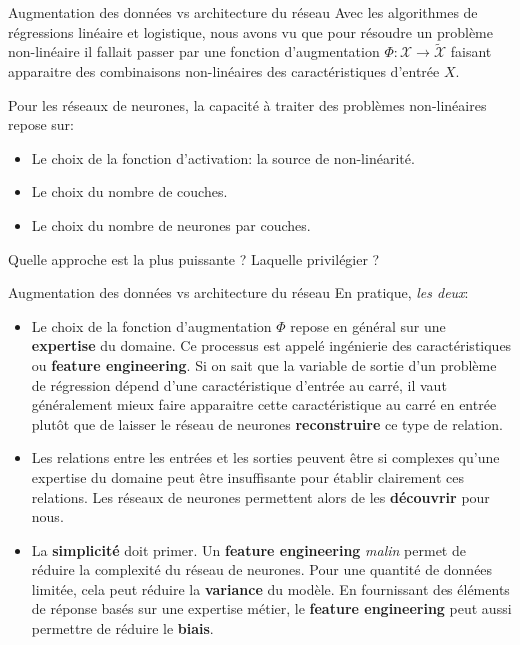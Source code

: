 \begin{frame}{Augmentation des données vs architecture du réseau}
	Avec les algorithmes de régressions linéaire et logistique, nous avons vu que pour résoudre un problème non-linéaire il fallait passer par une fonction d'augmentation $\Phi: \mathcal{X} \to \tilde{\mathcal{X}}$ faisant apparaitre des combinaisons non-linéaires des caractéristiques d'entrée $X$.
	
	\vspace{0.5cm}
	\pause
	
	Pour les réseaux de neurones, la capacité à traiter des problèmes non-linéaires repose sur:
	\begin{itemize}
		\item Le choix de la fonction d'activation: la source de non-linéarité.
		\item Le choix du nombre de couches.
		\item Le choix du nombre de neurones par couches.
	\end{itemize}
	
	\vspace{0.5cm}
	\pause
	
	Quelle approche est la plus puissante ? Laquelle privilégier ?
	
\end{frame}

\begin{frame}{Augmentation des données vs architecture du réseau}
	En pratique, \textit{les deux}:
	
	\begin{itemize}
		\item Le choix de la fonction d'augmentation $\Phi$ repose en général sur une \textbf{expertise} du domaine. Ce processus est appelé ingénierie des caractéristiques ou \textbf{feature engineering}. Si on sait que la variable de sortie d'un problème de régression dépend d'une caractéristique d'entrée au carré, il vaut généralement mieux faire apparaitre cette caractéristique au carré en entrée plutôt que de laisser le réseau de neurones \textbf{reconstruire} ce type de relation.
		\pause
		\item Les relations entre les entrées et les sorties peuvent être si complexes qu'une expertise du domaine peut être insuffisante pour établir clairement ces relations. Les réseaux de neurones permettent alors de les \textbf{découvrir} pour nous.
		\pause
		\item La \textbf{simplicité} doit primer. Un \textbf{feature engineering} \textit{malin} permet de réduire la complexité du réseau de neurones. Pour une quantité de données limitée, cela peut réduire la \textbf{variance} du modèle. En fournissant des éléments de réponse basés sur une expertise métier, le \textbf{feature engineering} peut aussi permettre de réduire le \textbf{biais}.
	\end{itemize}	
\end{frame}

